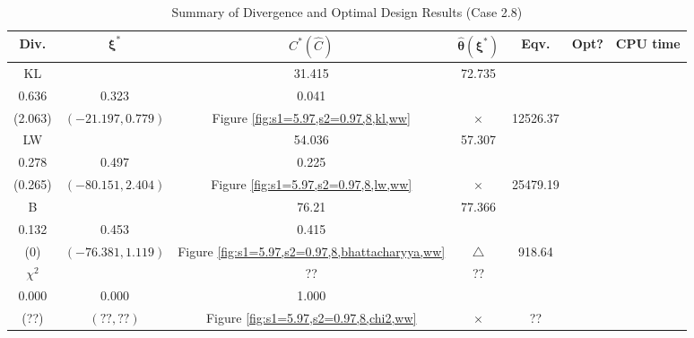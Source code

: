 \documentclass[12pt, a4paper]{article}
\begin{document}
\begin{table}[H]
\centering
\renewcommand{\arraystretch}{1.5} %
\setlength{\tabcolsep}{8pt} %
\begin{tabular}{|c|c|c|c|c|c|c|}
\hline
\textbf{Div.} & \(\boldsymbol{\xi^*}\) & \(C^* (\hat{C})\) & \(\boldsymbol{\hat{\theta}(\xi^*)}\) & \textbf{Eqv.} & \textbf{Opt?} & \textbf{CPU time} \\
\hline
KL & \(\left\{\begin{array}{ccc}
28.376 & 31.415 & 72.735 \\
0.636 & 0.323 & 0.041
\end{array}\right\}\) &
\(\begin{array}{c}
0 \\
(2.063)
\end{array}\) & 
\((-21.197, 0.779)\) & 
Figure \ref{fig:s1=5.97,s2=0.97,8,kl,ww} & $\times$ & 12526.37 \\
\hline
LW & \(\left\{\begin{array}{ccc}
51.869 & 54.036 & 57.307 \\
0.278 & 0.497 & 0.225
\end{array}\right\}\) &
\(\begin{array}{c}
0.269 \\
(0.265)
\end{array}\) & 
\((-80.151, 2.404)\) & 
Figure \ref{fig:s1=5.97,s2=0.97,8,lw,ww} & $\times$ & 25479.19 \\
\hline
B & \(\left\{\begin{array}{ccc}
31.364 & 76.21 & 77.366 \\
0.132 & 0.453 & 0.415
\end{array}\right\}\) &
\(\begin{array}{c}
0 \\
(0)
\end{array}\) & 
\((-76.381, 1.119)\) & 
Figure \ref{fig:s1=5.97,s2=0.97,8,bhattacharyya,ww} & $\triangle$ & 918.64 \\
\hline
\(\chi^2\) & \(\left\{\begin{array}{ccc}
?? & ?? & ?? \\
0.000 & 0.000 & 1.000
\end{array}\right\}\) &
\(\begin{array}{c}
?? \\
(??)
\end{array}\) & 
\((??, ??)\) & 
Figure \ref{fig:s1=5.97,s2=0.97,8,chi2,ww} & $\times$ & ?? \\
\hline
\end{tabular}
\caption{Summary of Divergence and Optimal Design Results (Case 2.8)}
\label{tab:results2.8}
\end{table}
\end{document}
